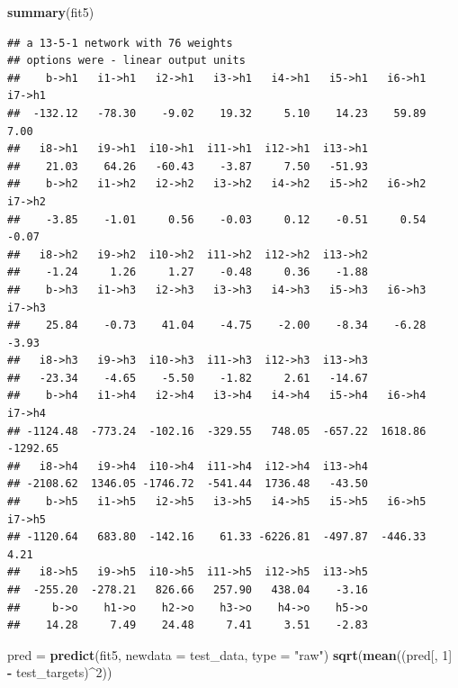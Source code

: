 \documentclass[10pt,ignorenonframetext,]{beamer}
\newenvironment{Shaded}{\begin{snugshade}}{\end{snugshade}}
\newcommand{\KeywordTok}[1]{\textcolor[rgb]{0.13,0.29,0.53}{\textbf{#1}}}
\newcommand{\DataTypeTok}[1]{\textcolor[rgb]{0.13,0.29,0.53}{#1}}
\newcommand{\DecValTok}[1]{\textcolor[rgb]{0.00,0.00,0.81}{#1}}
\newcommand{\StringTok}[1]{\textcolor[rgb]{0.31,0.60,0.02}{#1}}
\newcommand{\OperatorTok}[1]{\textcolor[rgb]{0.81,0.36,0.00}{\textbf{#1}}}
\newcommand{\NormalTok}[1]{#1}
\begin{document}
\begin{frame}[fragile]
\begin{Shaded}
\begin{Highlighting}[]
\KeywordTok{summary}\NormalTok{(fit5)}
\end{Highlighting}
\end{Shaded}

\begin{verbatim}
## a 13-5-1 network with 76 weights
## options were - linear output units 
##    b->h1   i1->h1   i2->h1   i3->h1   i4->h1   i5->h1   i6->h1   i7->h1 
##  -132.12   -78.30    -9.02    19.32     5.10    14.23    59.89     7.00 
##   i8->h1   i9->h1  i10->h1  i11->h1  i12->h1  i13->h1 
##    21.03    64.26   -60.43    -3.87     7.50   -51.93 
##    b->h2   i1->h2   i2->h2   i3->h2   i4->h2   i5->h2   i6->h2   i7->h2 
##    -3.85    -1.01     0.56    -0.03     0.12    -0.51     0.54    -0.07 
##   i8->h2   i9->h2  i10->h2  i11->h2  i12->h2  i13->h2 
##    -1.24     1.26     1.27    -0.48     0.36    -1.88 
##    b->h3   i1->h3   i2->h3   i3->h3   i4->h3   i5->h3   i6->h3   i7->h3 
##    25.84    -0.73    41.04    -4.75    -2.00    -8.34    -6.28    -3.93 
##   i8->h3   i9->h3  i10->h3  i11->h3  i12->h3  i13->h3 
##   -23.34    -4.65    -5.50    -1.82     2.61   -14.67 
##    b->h4   i1->h4   i2->h4   i3->h4   i4->h4   i5->h4   i6->h4   i7->h4 
## -1124.48  -773.24  -102.16  -329.55   748.05  -657.22  1618.86 -1292.65 
##   i8->h4   i9->h4  i10->h4  i11->h4  i12->h4  i13->h4 
## -2108.62  1346.05 -1746.72  -541.44  1736.48   -43.50 
##    b->h5   i1->h5   i2->h5   i3->h5   i4->h5   i5->h5   i6->h5   i7->h5 
## -1120.64   683.80  -142.16    61.33 -6226.81  -497.87  -446.33     4.21 
##   i8->h5   i9->h5  i10->h5  i11->h5  i12->h5  i13->h5 
##  -255.20  -278.21   826.66   257.90   438.04    -3.16 
##     b->o    h1->o    h2->o    h3->o    h4->o    h5->o 
##    14.28     7.49    24.48     7.41     3.51    -2.83
\end{verbatim}

\begin{Shaded}
\begin{Highlighting}[]
\NormalTok{pred =}\StringTok{ }\KeywordTok{predict}\NormalTok{(fit5, }\DataTypeTok{newdata =}\NormalTok{ test_data, }\DataTypeTok{type =} \StringTok{"raw"}\NormalTok{)}
\KeywordTok{sqrt}\NormalTok{(}\KeywordTok{mean}\NormalTok{((pred[, }\DecValTok{1}\NormalTok{] }\OperatorTok{-}\StringTok{ }\NormalTok{test_targets)}\OperatorTok{^}\DecValTok{2}\NormalTok{))}
\end{Highlighting}
\end{Shaded}


\end{frame}
\end{document}
